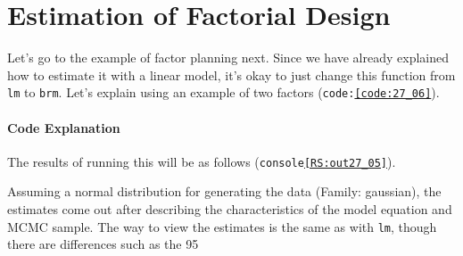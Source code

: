 \documentclass{ltjsarticle}
\begin{document}


\section{Estimation of Factorial Design}
Let's go to the example of factor planning next. Since we have already explained how to estimate it with a linear model, it's okay to just change this function from \texttt{lm} to \texttt{brm}. Let's explain using an example of two factors (\texttt{code:\ref{code:27_06}}).


\paragraph{Code Explanation}

The results of running this will be as follows (\texttt{console\ref{RS:out27_05}}).

Assuming a normal distribution for generating the data (Family: gaussian), the estimates come out after describing the characteristics of the model equation and MCMC sample. The way to view the estimates is the same as with \texttt{lm}, though there are differences such as the 95%
\end{document}
